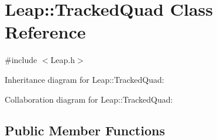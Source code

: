 \hypertarget{class_leap_1_1_tracked_quad}{}\section{Leap\+:\+:Tracked\+Quad Class Reference}
\label{class_leap_1_1_tracked_quad}


{\ttfamily \#include $<$Leap.\+h$>$}



Inheritance diagram for Leap\+:\+:Tracked\+Quad\+:


Collaboration diagram for Leap\+:\+:Tracked\+Quad\+:
\subsection*{Public Member Functions}
